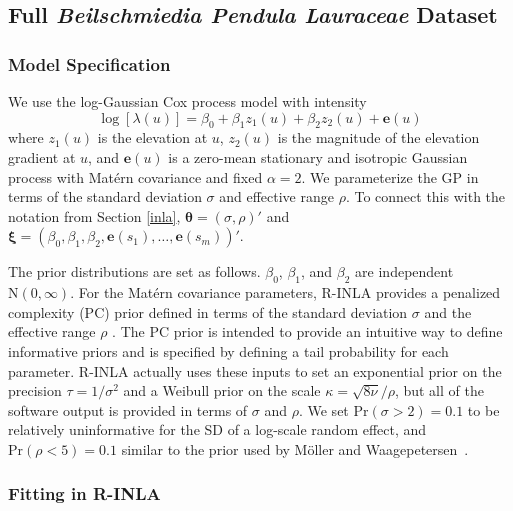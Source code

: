 \documentclass{interact}
\begin{document}
\subsection{Full {\it Beilschmiedia Pendula Lauraceae} Dataset}
\label{beianalysis}


\subsubsection{Model Specification}
\label{beimodel}

We use the log-Gaussian Cox process model with intensity
\begin{equation}
\log\left[\lambda(u)\right] = \beta_{0} + \beta_{1} z_{1}(u)
+ \beta_{2} z_{2}(u) + \mathbf{e}(u)
\end{equation}
where \(z_{1}(u)\) is the elevation at \(u\), \(z_{2}(u)\) is the magnitude of
the elevation gradient at \(u\), and \(\mathbf{e}(u)\) is a zero-mean
stationary and isotropic Gaussian process with Mat\'{e}rn covariance and fixed
\(\alpha = 2\). We parameterize the GP in terms of the standard deviation
\(\sigma\) and effective range \(\rho\). To connect this with the notation
from Section \ref{inla}, \(\boldsymbol{\theta} = (\sigma, \rho)'\) and
\(\boldsymbol{\xi} = (\beta_{0}, \beta_{1}, \beta_{2}, \mathbf{e}(s_{1}),
\dots, \mathbf{e}(s_{m}))'\).

The prior distributions are set as follows. \(\beta_{0}\), \(\beta_{1}\), and
\(\beta_{2}\) are independent \(\mathrm{N}(0, \infty)\). For the Mat\'{e}rn
covariance parameters, R-INLA provides a penalized complexity (PC) prior
defined in terms of the standard deviation \(\sigma\) and the effective range
\(\rho\) \cite{fuglstadetal,simpsonpc}. The PC prior is intended to provide an
intuitive way to define informative priors and is specified by defining a tail
probability for each parameter. R-INLA actually uses these inputs to set an
exponential prior on the precision \(\tau = 1 / \sigma^{2}\) and a Weibull
prior on the scale \(\kappa = \sqrt{8 \nu} / \rho\), but all of the software output
is provided in terms of \(\sigma\) and \(\rho\). We set
\(\mathrm{Pr}(\sigma > 2) = 0.1\) to be relatively uninformative for the SD of
a log-scale random effect, and \(\mathrm{Pr}(\rho < 5) = 0.1\) similar to the
prior used by M\"{o}ller and Waagepetersen~\cite{moellerwaagepetersen}.


\subsubsection{Fitting in R-INLA}
\label{beifitting}
\end{document}
